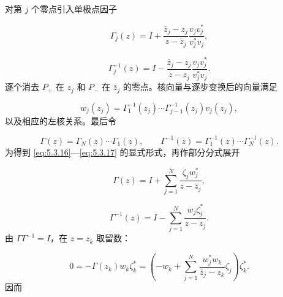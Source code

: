 \documentclass[
    lang=cn,
    scheme=chinese,
    mode=simple,
    device=normal,
    color=blue,
    math=cm,
    thmcnt=section,
    12pt,
    nowatermark
]{elegantbook}
\begin{document}
\begin{callout}
    对第 $j$ 个零点引入单极点因子

    \[
        \Gamma_j(z)
        =
        I+
        \dfrac{\bar z_j-z_j}{z-\bar z_j}
        \dfrac{v_jv_j^*}{v_j^*v_j},
    \]

    \begin{equation}
        \Gamma_j^{-1}(z)
        =
        I-
        \dfrac{\bar z_j-z_j}{z-z_j}
        \dfrac{v_jv_j^*}{v_j^*v_j}.
        \tag{5.3.19}
        \label{eq:5.3.19}
    \end{equation}
    逐个消去 $P_+$ 在 $z_j$ 和 $P_-$ 在 $\bar z_j$ 的零点。核向量与逐步变换后的向量满足

    \begin{equation}
        w_j(z_j)
        =
        \Gamma_1^{-1}(z_j)\cdots
        \Gamma_{j-1}^{-1}(z_j)v_j(z_j),
        \tag{5.3.18}
        \label{eq:5.3.18}
    \end{equation}
    以及相应的左核关系。最后令

    \begin{equation}
        \Gamma(z)
        =
        \Gamma_N(z)\cdots\Gamma_1(z),
        \qquad
        \Gamma^{-1}(z)
        =
        \Gamma_1^{-1}(z)\cdots\Gamma_N^{-1}(z).
        \tag{5.3.20}
        \label{eq:5.3.20}
    \end{equation}
    为得到 \eqref{eq:5.3.16}---\eqref{eq:5.3.17} 的显式形式，再作部分分式展开

    \begin{equation}
        \Gamma(z)
        =
        I+
        \sum\limits_{j=1}^{N}
        \dfrac{\zeta_jw_j^*}{z-\bar z_j},
        \tag{5.3.21}
        \label{eq:5.3.21}
    \end{equation}

    \begin{equation}
        \Gamma^{-1}(z)
        =
        I-
        \sum\limits_{j=1}^{N}
        \dfrac{w_j\zeta_j^*}{z-z_j}.
        \tag{5.3.22}
        \label{eq:5.3.22}
    \end{equation}
    由 $\Gamma\Gamma^{-1}=I$，在 $z=z_k$ 取留数：

    \begin{equation}
        0
        =
        -\Gamma(z_k)w_k\zeta_k^*
        =
        \left(
        -w_k+
        \sum\limits_{j=1}^{N}
        \dfrac{w_j^*w_k}{\bar z_j-z_k}\zeta_j
        \right)\zeta_k^*.
        \tag{5.3.23}
        \label{eq:5.3.23}
    \end{equation}
    因而


\end{callout}
\end{document}
